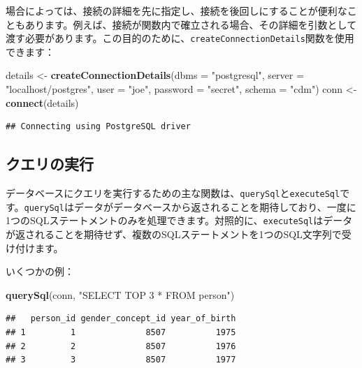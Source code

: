 \documentclass[
  11pt]{book}
\newenvironment{Shaded}{\begin{snugshade}}{\end{snugshade}}
\newcommand{\AttributeTok}[1]{\textcolor[rgb]{0.13,0.29,0.53}{#1}}
\newcommand{\FunctionTok}[1]{\textcolor[rgb]{0.13,0.29,0.53}{\textbf{#1}}}
\newcommand{\NormalTok}[1]{#1}
\newcommand{\OtherTok}[1]{\textcolor[rgb]{0.56,0.35,0.01}{#1}}
\newcommand{\StringTok}[1]{\textcolor[rgb]{0.31,0.60,0.02}{#1}}
\theoremstyle{definition}
\theoremstyle{definition}
\theoremstyle{definition}
\theoremstyle{definition}
\theoremstyle{remark}
\begin{document}
場合によっては、接続の詳細を先に指定し、接続を後回しにすることが便利なこともあります。例えば、接続が関数内で確立される場合、その詳細を引数として渡す必要があります。この目的のために、\texttt{createConnectionDetails}関数を使用できます：

\begin{Shaded}
\begin{Highlighting}[]
\NormalTok{details }\OtherTok{\textless{}{-}} \FunctionTok{createConnectionDetails}\NormalTok{(}\AttributeTok{dbms =} \StringTok{"postgresql"}\NormalTok{,}
                                   \AttributeTok{server =} \StringTok{"localhost/postgres"}\NormalTok{,}
                                   \AttributeTok{user =} \StringTok{"joe"}\NormalTok{,}
                                   \AttributeTok{password =} \StringTok{"secret"}\NormalTok{,}
                                   \AttributeTok{schema =} \StringTok{"cdm"}\NormalTok{)}
\NormalTok{conn }\OtherTok{\textless{}{-}} \FunctionTok{connect}\NormalTok{(details)}
\end{Highlighting}
\end{Shaded}

\begin{verbatim}
## Connecting using PostgreSQL driver
\end{verbatim}

\subsection{クエリの実行}\label{ux30afux30a8ux30eaux306eux5b9fux884c}

データベースにクエリを実行するための主な関数は、\texttt{querySql}と\texttt{executeSql}です。\texttt{querySql}はデータがデータベースから返されることを期待しており、一度に1つのSQLステートメントのみを処理できます。対照的に、\texttt{executeSql}はデータが返されることを期待せず、複数のSQLステートメントを1つのSQL文字列で受け付けます。 

いくつかの例：

\begin{Shaded}
\begin{Highlighting}[]
\FunctionTok{querySql}\NormalTok{(conn, }\StringTok{"SELECT TOP 3 * FROM person"}\NormalTok{)}
\end{Highlighting}
\end{Shaded}

\begin{verbatim}
##   person_id gender_concept_id year_of_birth
## 1         1              8507          1975
## 2         2              8507          1976
## 3         3              8507          1977
\end{verbatim}
\end{document}
